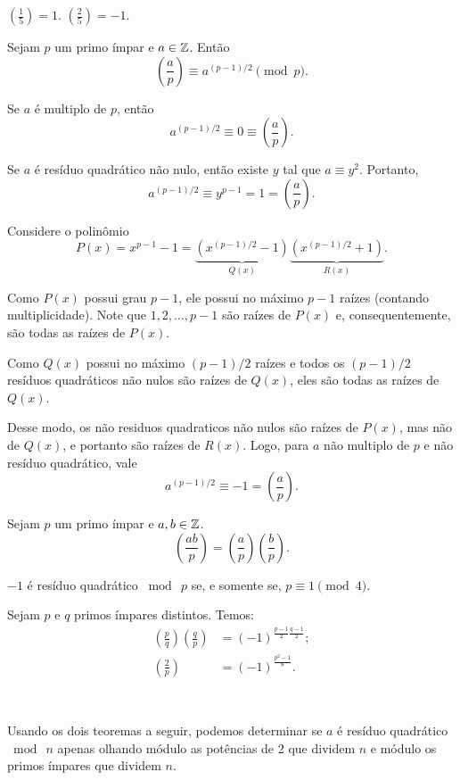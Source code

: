 \documentclass[10pt,a4paper]{article}
\newcommand{\leg}[2]{\left(\frac{#1}{#2}\right)}
\newcommand{\tmod}[1]{\bmod{\ #1}}
\begin{document}
	\begin{exmp}
		$\leg{1}{5} = 1$. $\leg{2}{5} = -1$.
	\end{exmp}
	\begin{thm}
		Sejam $p$ um primo ímpar e $a \in \mathbb{Z}$. Então
		$$\leg{a}{p} \equiv a^{(p-1)/2}\pmod{p}.$$
	\end{thm}
	\begin{dem}
		Se $a$ é multiplo de $p$, então \[ a^{(p-1)/2} \equiv 0 \equiv \leg{a}{p}.\]
	
		Se $a$ é resíduo quadrático não nulo, então existe $y$ tal que $a \equiv y^2$. Portanto, \[a^{(p-1)/2} \equiv y^{p-1} = 1 = \leg{a}{p}.\]
		
		Considere o polinômio \[P(x) = x^{p-1} - 1 = \underbrace{(x^{(p-1)/2} - 1)}_{Q(x)}\underbrace{(x^{(p-1)/2} + 1)}_{R(x)}.\]
		
		Como $P(x)$ possui grau $p-1$, ele possui no máximo $p-1$ raízes (contando multiplicidade). Note que $1, 2, \dots, p-1$ são raízes de $P(x)$ e, consequentemente, são todas as raízes de $P(x)$.

		Como $Q(x)$ possui no máximo $(p-1)/2$ raízes e todos os $(p-1)/2$ resíduos quadráticos não nulos são raízes de $Q(x)$, eles são todas as raízes de $Q(x)$.

		Desse modo, os não residuos quadraticos não nulos são raízes de $P(x)$, mas não de $Q(x)$, e portanto são raízes de $R(x)$. Logo, para  $a$ não multiplo de $p$ e não resíduo quadrático, vale
		\[a^{(p-1)/2} \equiv -1 = \leg{a}{p}.\]
	\end{dem}
	\begin{cor}
		Sejam $p$ um primo ímpar e $a, b \in \mathbb{Z}$.
		$$\leg{ab}{p} = \leg{a}{p}\leg{b}{p}.$$
	\end{cor}
	\begin{cor}
		$-1$ é resíduo quadrático $\tmod{p}$ se, e somente se, $p \equiv 1 \pmod{4}$.
	\end{cor}
	\begin{thm}
		Sejam $p$ e $q$ primos ímpares distintos. Temos:
		\begin{align*}
			\leg{p}{q} \leg{q}{p} & = (-1)^{\frac{p-1}{2}\frac{q-1}{2}};\\
			\leg{2}{p} & = (-1)^\frac{p^2 - 1}{8}.
		\end{align*}
	\end{thm}\

	Usando os dois teoremas a seguir, podemos determinar se $a$ é resíduo quadrático $\tmod{n}$ apenas olhando módulo as potências de 2 que dividem $n$ e módulo os primos ímpares que dividem $n$.
\end{document}
